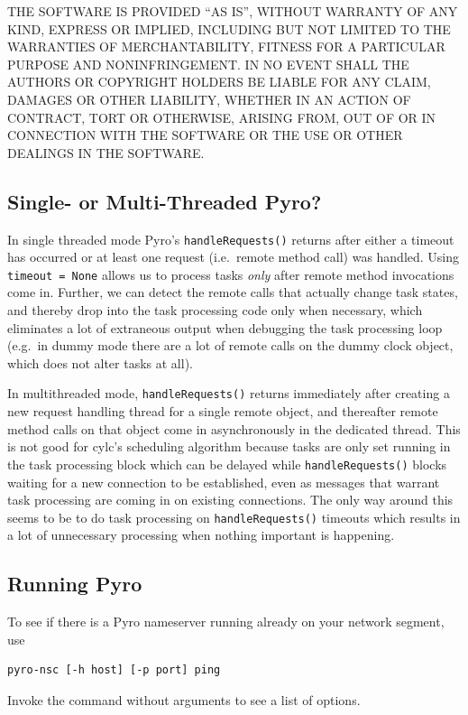 \documentclass[11pt,a4paper]{article}
\begin{document}
THE SOFTWARE IS PROVIDED ``AS IS'', WITHOUT WARRANTY OF ANY KIND,
EXPRESS OR IMPLIED, INCLUDING BUT NOT LIMITED TO THE WARRANTIES OF
MERCHANTABILITY, FITNESS FOR A PARTICULAR PURPOSE AND NONINFRINGEMENT.
IN NO EVENT SHALL THE AUTHORS OR COPYRIGHT HOLDERS BE LIABLE FOR ANY
CLAIM, DAMAGES OR OTHER LIABILITY, WHETHER IN AN ACTION OF CONTRACT,
TORT OR OTHERWISE, ARISING FROM, OUT OF OR IN CONNECTION WITH THE
SOFTWARE OR THE USE OR OTHER DEALINGS IN THE SOFTWARE.
                                          
\subsection{Single- or Multi-Threaded Pyro?}
\label{Single-orMulti-ThreadedPyro?}

In single threaded mode Pyro's \lstinline=handleRequests()= returns
after either a timeout has occurred or at least one request
(i.e.\ remote method call) was handled. Using \lstinline|timeout = None| 
allows us to process tasks {\em only} after remote method invocations
come in.  Further, we can detect the remote calls that actually change
task states, and thereby drop into the task processing code only when
necessary, which eliminates a lot of extraneous output when debugging
the task processing loop (e.g.\ in dummy mode there are a lot of remote
calls on the dummy clock object, which does not alter tasks at all). 

In multithreaded mode, \lstinline=handleRequests()= returns immediately
after creating a new request handling thread for a single remote object,
and thereafter remote method calls on that object come in asynchronously
in the dedicated thread. This is not good for cylc's scheduling
algorithm because tasks are only set running in the task processing
block which can be delayed while \lstinline=handleRequests()= blocks waiting
for a new connection to be established, even as messages that warrant
task processing are coming in on existing connections. The only way
around this seems to be to do task processing on \lstinline=handleRequests()=
timeouts which results in a lot of unnecessary processing when nothing
important is happening.

\subsection{Running Pyro}
\label{RunningPyro}

To see if there is a Pyro nameserver running already on your network
segment, use 
\begin{lstlisting}
pyro-nsc [-h host] [-p port] ping
\end{lstlisting}
Invoke the command without arguments to see a list of options.
\end{document}
